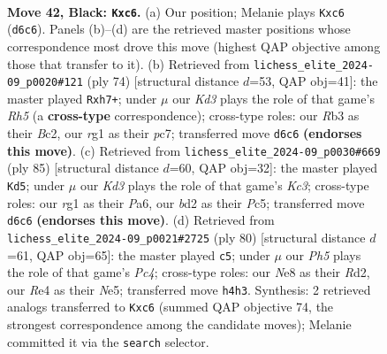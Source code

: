\documentclass[11pt]{article}
\begin{document}
\clearpage

\begin{figure}[p]\centering
\begin{subfigure}{0.46\textwidth}\centering
\resizebox{\linewidth}{!}{%
\newchessgame
\chessboard[
  setfen={4n3/p1p5/2Pk1p1R/8/4rP1p/1r6/3B3P/3K1BR1 b - - 3 42},
  showmover=false,
  pgfstyle=straightmove, color=movearrow, markmove={d6-c6}
]}
\caption{}
\end{subfigure}\hfill
\begin{subfigure}{0.46\textwidth}\centering
\resizebox{\linewidth}{!}{%
\newchessgame
\chessboard[
  setfen={br6/2p3kp/2P1p3/1P2P2R/1b3P2/5K2/2B1N3/8 w - - 7 38},
  showmover=false,
  pgfstyle=straightmove, color=movearrow, markmove={h5-h7}
]}
\caption{}
\end{subfigure}
\\[4pt]
\begin{subfigure}{0.46\textwidth}\centering
\resizebox{\linewidth}{!}{%
\newchessgame
\chessboard[
  setfen={5R2/6p1/p1k1p3/r1p1n1P1/P2n4/8/4BK2/R7 b - - 8 43},
  showmover=false,
  pgfstyle=straightmove, color=movearrow, markmove={c6-d5}
]}
\caption{}
\end{subfigure}\hfill
\begin{subfigure}{0.46\textwidth}\centering
\resizebox{\linewidth}{!}{%
\newchessgame
\chessboard[
  setfen={5k2/1p4p1/2prb1P1/p3N3/P1PP4/5PKp/3R4/8 w - - 3 41},
  showmover=false,
  pgfstyle=straightmove, color=movearrow, markmove={c4-c5}
]}
\caption{}
\end{subfigure}
\caption{\textbf{Move 42, Black: \texttt{Kxc6}.} (a) Our position; Melanie plays \texttt{Kxc6} (\texttt{d6c6}). Panels (b)--(d) are the retrieved master positions whose correspondence most drove this move (highest QAP objective among those that transfer to it). (b) Retrieved from \texttt{lichess\_elite\_2024-09\_p0020\#121} (ply 74) [structural distance $d$=53, QAP obj=41]: the master played \texttt{Rxh7+}; under $\mu$ our \emph{Kd3} plays the role of that game's \emph{Rh5} (a \textbf{cross-type} correspondence); cross-type roles: our \emph{R}b3 as their \emph{B}c2, our \emph{r}g1 as their \emph{p}c7; transferred move \texttt{d6c6} \textbf{(endorses this move)}. (c) Retrieved from \texttt{lichess\_elite\_2024-09\_p0030\#669} (ply 85) [structural distance $d$=60, QAP obj=32]: the master played \texttt{Kd5}; under $\mu$ our \emph{Kd3} plays the role of that game's \emph{Kc3}; cross-type roles: our \emph{r}g1 as their \emph{P}a6, our \emph{b}d2 as their \emph{P}c5; transferred move \texttt{d6c6} \textbf{(endorses this move)}. (d) Retrieved from \texttt{lichess\_elite\_2024-09\_p0021\#2725} (ply 80) [structural distance $d$=61, QAP obj=65]: the master played \texttt{c5}; under $\mu$ our \emph{Ph5} plays the role of that game's \emph{Pc4}; cross-type roles: our \emph{N}e8 as their \emph{R}d2, our \emph{R}e4 as their \emph{N}e5; transferred move \texttt{h4h3}. Synthesis: 2 retrieved analogs transferred to \texttt{Kxc6} (summed QAP objective 74, the strongest correspondence among the candidate moves); Melanie committed it via the \texttt{search} selector.}
\label{fig:thought-m83}
\end{figure}
\end{document}
